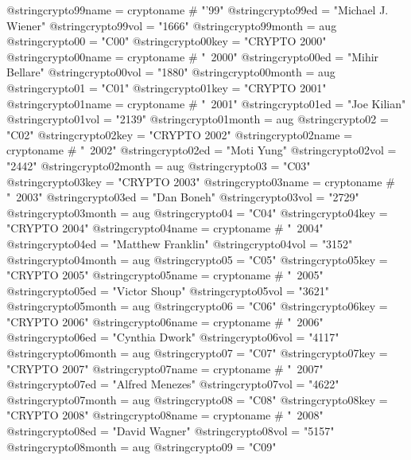 @string{crypto99name =          cryptoname # "'99"}
@string{crypto99ed =            "Michael J. Wiener"}
@string{crypto99vol =           "1666"}
@string{crypto99month =         aug}
@string{crypto00 =              "C00"}
@string{crypto00key =           "CRYPTO 2000"}
@string{crypto00name =          cryptoname # "~2000"}
@string{crypto00ed =            "Mihir Bellare"}
@string{crypto00vol =           "1880"}
@string{crypto00month =         aug}
@string{crypto01 =              "C01"}
@string{crypto01key =           "CRYPTO 2001"}
@string{crypto01name =          cryptoname # "~2001"}
@string{crypto01ed =            "Joe Kilian"}
@string{crypto01vol =           "2139"}
@string{crypto01month =         aug}
@string{crypto02 =              "C02"}
@string{crypto02key =           "CRYPTO 2002"}
@string{crypto02name =          cryptoname # "~2002"}
@string{crypto02ed =            "Moti Yung"}
@string{crypto02vol =           "2442"}
@string{crypto02month =         aug}
@string{crypto03 =              "C03"}
@string{crypto03key =           "CRYPTO 2003"}
@string{crypto03name =          cryptoname # "~2003"}
@string{crypto03ed =            "Dan Boneh"}
@string{crypto03vol =           "2729"}
@string{crypto03month =         aug}
@string{crypto04 =              "C04"}
@string{crypto04key =           "CRYPTO 2004"}
@string{crypto04name =          cryptoname # "~2004"}
@string{crypto04ed =            "Matthew Franklin"}
@string{crypto04vol =           "3152"}
@string{crypto04month =         aug}
@string{crypto05 =              "C05"}
@string{crypto05key =           "CRYPTO 2005"}
@string{crypto05name =          cryptoname # "~2005"}
@string{crypto05ed =            "Victor Shoup"}
@string{crypto05vol =           "3621"}
@string{crypto05month =         aug}
@string{crypto06 =              "C06"}
@string{crypto06key =           "CRYPTO 2006"}
@string{crypto06name =          cryptoname # "~2006"}
@string{crypto06ed =            "Cynthia Dwork"}
@string{crypto06vol =           "4117"}
@string{crypto06month =         aug}
@string{crypto07 =              "C07"}
@string{crypto07key =           "CRYPTO 2007"}
@string{crypto07name =          cryptoname # "~2007"}
@string{crypto07ed =            "Alfred Menezes"}
@string{crypto07vol =           "4622"}
@string{crypto07month =         aug}
@string{crypto08 =              "C08"}
@string{crypto08key =           "CRYPTO 2008"}
@string{crypto08name =          cryptoname # "~2008"}
@string{crypto08ed =            "David Wagner"}
@string{crypto08vol =           "5157"}
@string{crypto08month =         aug}
@string{crypto09 =              "C09"}
